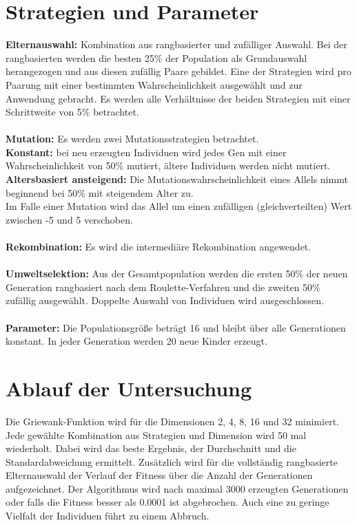 \documentclass[12pt,
    a4paper,
    headinclude,
    footinclude]{scrartcl}
\begin{document}
	\section{Strategien und Parameter}

	\textbf{Elternauswahl:} Kombination aus rangbasierter und zufälliger Auswahl. Bei der rangbasierten werden die besten 25\% der Population als Grundauswahl herangezogen und aus diesen zufällig Paare gebildet.
	Eine der Strategien wird pro Paarung mit einer bestimmten Wahrscheinlichkeit ausgewählt und zur Anwendung gebracht. Es werden alle Verhältnisse der beiden Strategien mit einer Schrittweite von 5\% betrachtet. \\\\	
	\textbf{Mutation:} Es werden zwei Mutationsstrategien betrachtet. \\
	\textbf{Konstant:} bei neu erzeugten Individuen wird jedes Gen mit einer Wahrscheinlichkeit von 50\% mutiert, ältere Individuen werden nicht mutiert.
	\textbf{Altersbasiert ansteigend:} Die Mutationswahrscheinlichkeit eines Allels nimmt beginnend bei 50\% mit steigendem Alter zu.\\
	Im Falle einer Mutation wird das Allel um einen zufälligen (gleichverteilten) Wert zwischen -5 und 5 verschoben. \\\\
	\textbf{Rekombination:} Es wird die intermediäre Rekombination angewendet.\\\\
	\textbf{Umweltselektion:} Aus der Gesamtpopulation werden die ersten 50\% der neuen Generation rangbasiert nach dem Roulette-Verfahren und die zweiten 50\% zufällig ausgewählt. Doppelte Auswahl von Individuen wird ausgeschlossen.\\\\
	\textbf{Parameter:} Die Populationsgröße beträgt 16 und bleibt über alle Generationen konstant. In jeder Generation werden 20 neue Kinder erzeugt.
	
	\section{Ablauf der Untersuchung}
	Die Griewank-Funktion wird für die Dimensionen 2, 4, 8, 16 und 32 minimiert. Jede gewählte Kombination aus Strategien und Dimension wird 50 mal wiederholt. Dabei wird das beste Ergebnis, der Durchschnitt und die Standardabweichung ermittelt. Zusätzlich wird für die vollständig rangbasierte Elternauswahl der Verlauf der Fitness über die Anzahl der Generationen aufgezeichnet. Der Algorithmus wird nach maximal 3000 erzeugten Generationen oder falls die Fitness besser als 0.0001 ist abgebrochen. Auch eine zu geringe Vielfalt der Individuen führt zu einem Abbruch.
\newpage
\end{document}
